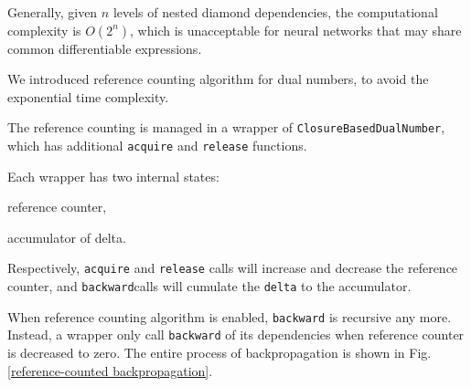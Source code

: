 Generally, given $n$ levels of nested diamond dependencies, the computational complexity is $O(2^n)$, which is unacceptable for neural networks that may share common \glspl{differentiable expression}.

We introduced reference counting algorithm for dual numbers, to avoid the exponential time complexity.

The reference counting is managed in a wrapper of \lstinline{ClosureBasedDualNumber}, which has additional \lstinline{acquire} and \lstinline{release} functions.

Each wrapper has two internal states:
\begin{enumerate*}
  \item reference counter,
  \item accumulator of delta.
\end{enumerate*}
Respectively, \lstinline{acquire} and \lstinline{release} calls will increase and decrease the reference counter, and \lstinline{backward}calls will cumulate the \lstinline{delta} to the accumulator.

When reference counting algorithm is enabled, \lstinline{backward} is recursive any more. Instead, a wrapper only call \lstinline{backward} of its dependencies when reference counter is decreased to zero. The entire process of backpropagation is shown in Fig. \ref{reference-counted backpropagation}.

